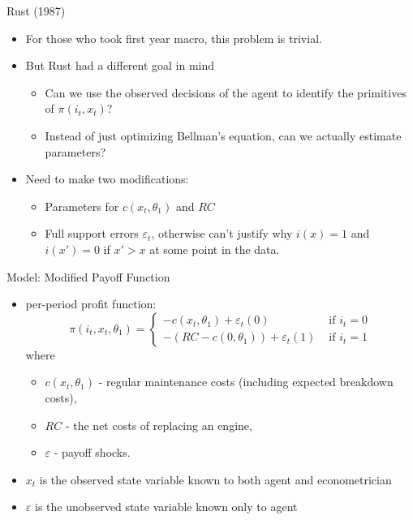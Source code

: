 \documentclass[xcolor=pdftex,dvipsnames,table,mathserif,aspectratio=169]{beamer}
\begin{document}
\begin{frame}{Rust (1987)}
\begin{itemize}
\item For those who took first year macro, this problem is trivial. 
\item But Rust had a different goal in mind
\begin{itemize}
\item Can we use the observed decisions of the agent to identify the primitives of $\pi(i_t,x_t)$?
\item Instead of just optimizing Bellman's equation, can we actually \alert{estimate parameters}?
\end{itemize}
\item Need to make two modifications: 
\begin{itemize}
\item Parameters for $c(x_t,\theta_1)$ and $RC$
\item Full support errors $\varepsilon_{t}$, otherwise can't justify why $i(x)=1$ and $i(x')=0$ if $x'>x$ at some point in the data.
\end{itemize}
\end{itemize}
\end{frame}

\begin{frame}{Model: Modified Payoff Function}
\begin{itemize}
	\item per-period profit function:\[
		\pi \left(i_{t},x_{t},\theta_{1}\right)=
		\begin{cases}
		-c\left(x_{t},\theta_{1}\right)+\varepsilon_{t}\left(0\right) & \mbox{ if }i_{t}=0\\		
		-\left(RC-c\left(0,\theta_{1}\right)\right)+\varepsilon_{t}\left(1\right) & \mbox{ if }i_{t}=1
		\end{cases}
		\]
	where \\
	\begin{itemize}
		\item $c\left(x_{t},\theta_{1}\right) $ -  regular maintenance costs (including expected breakdown costs),
		\item $RC$ - the net costs of replacing an engine,
		\item $\varepsilon$ - payoff shocks.
	\end{itemize}
	
	\item $x_{t}$ is the \alert{observed state variable} known to both agent and econometrician
	\item $\varepsilon$ is the \alert{unobserved state variable} known only to agent
\end{itemize}
\end{frame}
\end{document}
